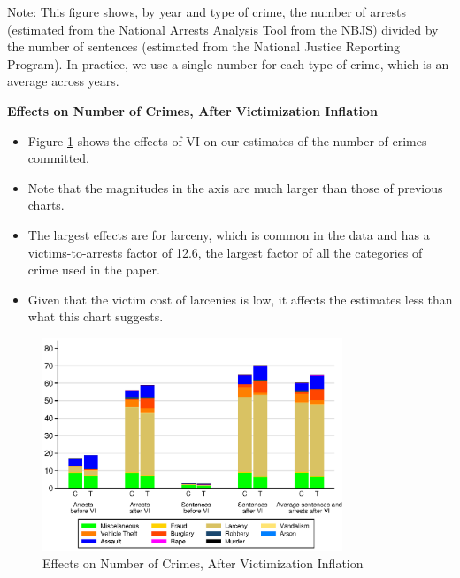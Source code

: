 \documentclass[static]{JJH-Beamer}
\begin{document}
{\flushleft \normalsize Note: This figure shows, by year and type of crime, the number of arrests (estimated from the National Arrests Analysis Tool from the NBJS) divided by the number of sentences (estimated from the National Justice Reporting Program). In practice, we use a single number for each type of crime, which is an average across years.\\}

\begin{frame}
 \addtocounter{framenumber}{-1}

\begin{center}
\textbf{Effects on Number of Crimes, After Victimization Inflation}
\end{center}
\begin{itemize}
\item Figure \ref{fig:count-vi} shows the effects of VI on our estimates of the number of crimes committed.
\item Note that the magnitudes in the axis are much larger than those of previous charts.
\item The largest effects are for larceny, which is common in the data and has a victims-to-arrests factor of 12.6, the largest factor of all the categories of crime used in the paper.
\item Given that the victim cost of larcenies is low, it affects the estimates less than what this chart suggests.
\end{itemize}

\end{frame}

\begin{frame}
 \addtocounter{framenumber}{-1}

\begin{figure}[H]
\caption{Effects on Number of Crimes, After Victimization Inflation}\label{fig:count-vi}
\begin{center}
\includegraphics[width=0.8\textwidth]{AppOutput/Crime/vi}
\end{center}
\end{figure}

\end{frame}
\end{document}
